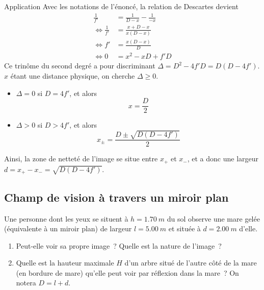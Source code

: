 \documentclass[../main/main.tex]{subfiles}
\begin{document}
\begin{NCexem}[sidebyside]{Application}
    Avec les notations de l'énoncé, la relation de Descartes devient
    \begin{align*}
        \frac{1}{f'} &= \frac{1}{D-x} - \frac{1}{-x}\\
        \Leftrightarrow \frac{1}{f'} &= \frac{x + D-x}{x(D-x)}\\
        \Leftrightarrow f' &= \frac{x(D-x)}{D}\\
        \Leftrightarrow 0 &= x^2 - xD + f'D 
    \end{align*}
    \tcblower
    Ce trinôme du second degré a pour discriminant $\Delta = D^2-4f'D =
    D(D-4f')$. $x$ étant une distance physique, on cherche $\Delta \geq 0$.
    \begin{itemize}
        \item $\Delta = 0$ si $D = 4f'$, et alors \[\boxed{x = \frac{D}{2}}\]
        \item $\Delta > 0$ si $D > 4f'$, et alors \[\boxed{x_\pm =
            \frac{D\pm\sqrt{D(D-4f')}}{2}}\]
    \end{itemize}
    Ainsi, la zone de netteté de l'image se situe entre $x_+$ et $x_-$, et a
    donc une largeur $d = x_+ - x_- = \sqrt{D(D-4f')}$.
\end{NCexem}

\subsection{Champ de vision à travers un miroir plan}
Une personne dont les yeux se situent à $h = \SI{1.70}{m}$ du sol observe une
mare gelée (équivalente à un miroir plan) de largeur $l = \SI{5.00}{m}$ et
située à $d = \SI{2.00}{m}$ d'elle.
\begin{enumerate}
    \item Peut-elle voir sa propre image~? Quelle est la nature de l'image~?
    \item Quelle est la hauteur maximale $H$ d'un arbre situé de l'autre côté de
        la mare (en bordure de mare) qu'elle peut voir par réflexion dans la
        mare~? On notera $D = l+d$.
\end{enumerate}
\end{document}
